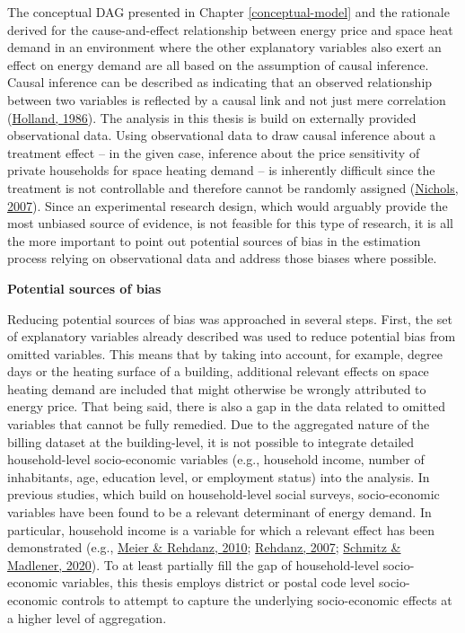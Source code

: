 \documentclass[12pt,twoside]{reedthesis}
\begin{document}
The conceptual DAG presented in Chapter \ref{conceptual-model} and the rationale derived for the cause-and-effect relationship between energy price and space heat demand in an environment where the other explanatory variables also exert an effect on energy demand are all based on the assumption of causal inference. Causal inference can be described as indicating that an observed relationship between two variables is reflected by a causal link and not just mere correlation (\protect\hyperlink{ref-holland86}{Holland, 1986}). The analysis in this thesis is build on externally provided observational data. Using observational data to draw causal inference about a treatment effect -- in the given case, inference about the price sensitivity of private households for space heating demand -- is inherently difficult since the treatment is not controllable and therefore cannot be randomly assigned (\protect\hyperlink{ref-nichols07}{Nichols, 2007}). Since an experimental research design, which would arguably provide the most unbiased source of evidence, is not feasible for this type of research, it is all the more important to point out potential sources of bias in the estimation process relying on observational data and address those biases where possible.

\textbf{Potential sources of bias}

Reducing potential sources of bias was approached in several steps. First, the set of explanatory variables already described was used to reduce potential bias from omitted variables. This means that by taking into account, for example, degree days or the heating surface of a building, additional relevant effects on space heating demand are included that might otherwise be wrongly attributed to energy price. That being said, there is also a gap in the data related to omitted variables that cannot be fully remedied. Due to the aggregated nature of the billing dataset at the building-level, it is not possible to integrate detailed household-level socio-economic variables (e.g., household income, number of inhabitants, age, education level, or employment status) into the analysis. In previous studies, which build on household-level social surveys, socio-economic variables have been found to be a relevant determinant of energy demand. In particular, household income is a variable for which a relevant effect has been demonstrated (e.g., \protect\hyperlink{ref-meier_rehdanz10}{Meier \& Rehdanz, 2010}; \protect\hyperlink{ref-rehdanz07}{Rehdanz, 2007}; \protect\hyperlink{ref-schmitz_madlener20}{Schmitz \& Madlener, 2020}). To at least partially fill the gap of household-level socio-economic variables, this thesis employs district or postal code level socio-economic controls to attempt to capture the underlying socio-economic effects at a higher level of aggregation.
\end{document}
